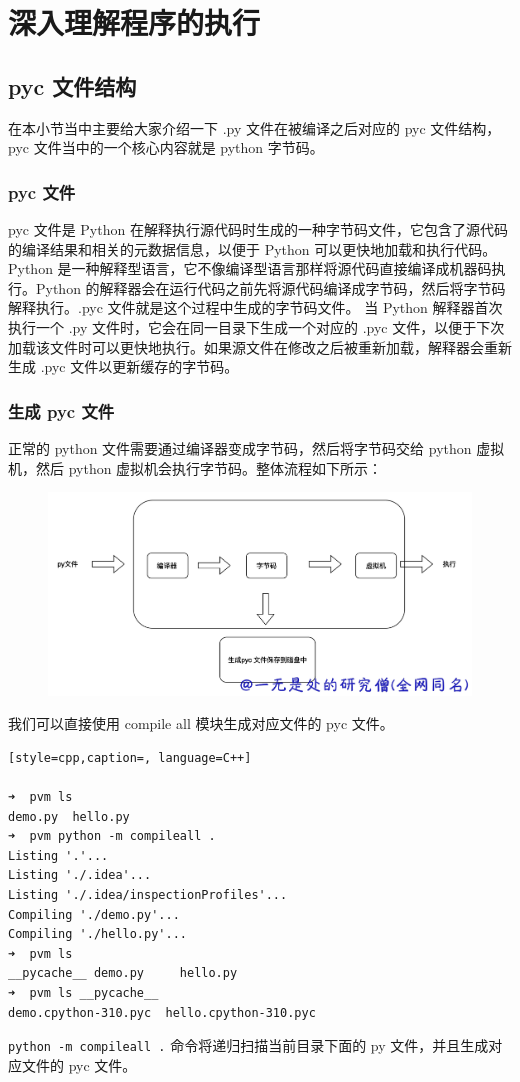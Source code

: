 \chapter{深入理解程序的执行}
\section{pyc 文件结构}
在本小节当中主要给大家介绍一下 .py 文件在被编译之后对应的 pyc 文件结构，pyc 文件当中的一个核心内容就是 python 字节码。
\subsection{pyc 文件}
pyc 文件是 Python 在解释执行源代码时生成的一种字节码文件，它包含了源代码的编译结果和相关的元数据信息，以便于 Python 可以更快地加载和执行代码。
Python 是一种解释型语言，它不像编译型语言那样将源代码直接编译成机器码执行。Python 的解释器会在运行代码之前先将源代码编译成字节码，然后将字节码解释执行。.pyc 文件就是这个过程中生成的字节码文件。
当 Python 解释器首次执行一个 .py 文件时，它会在同一目录下生成一个对应的 .pyc 文件，以便于下次加载该文件时可以更快地执行。如果源文件在修改之后被重新加载，解释器会重新生成 .pyc 文件以更新缓存的字节码。
\subsection{生成 pyc 文件}
正常的 python 文件需要通过编译器变成字节码，然后将字节码交给 python 虚拟机，然后 python 虚拟机会执行字节码。整体流程如下所示：

    \begin{figure}[H]
        \centering
            \includegraphics[scale=.25]{images/35-pyc.png}
						\caption{ }
        \label{fig:my_label}
    \end{figure}
    
我们可以直接使用 compile all 模块生成对应文件的 pyc 文件。
\begin{lstlisting}[style=cpp,caption=, language=C++]

➜  pvm ls
demo.py  hello.py
➜  pvm python -m compileall .
Listing '.'...
Listing './.idea'...
Listing './.idea/inspectionProfiles'...
Compiling './demo.py'...
Compiling './hello.py'...
➜  pvm ls
__pycache__ demo.py     hello.py
➜  pvm ls __pycache__ 
demo.cpython-310.pyc  hello.cpython-310.pyc
\end{lstlisting}
\verb|python -m compileall .| 命令将递归扫描当前目录下面的 py 文件，并且生成对应文件的 pyc 文件。
